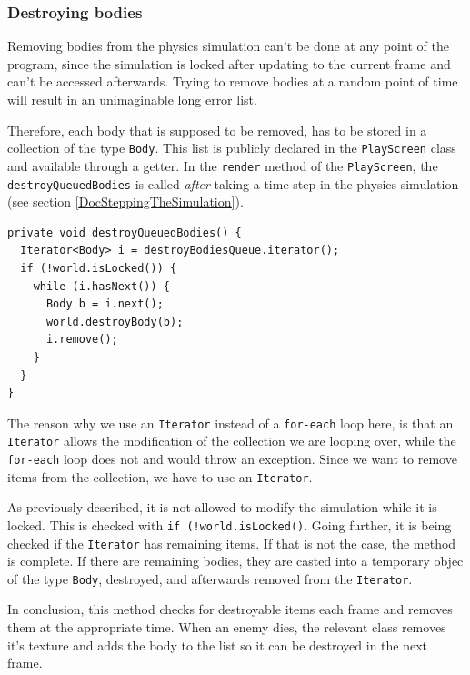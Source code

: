 \documentclass[12p]{article}
\begin{document}

\subsubsection{Destroying bodies} \label{DocDestroyingBodies}

Removing bodies from the physics simulation can't be done at any point of the program, since the simulation is locked after updating to the current frame and can't be accessed afterwards. Trying to remove bodies at a random point of time will result in an unimaginable long error list.

Therefore, each body that is supposed to be removed, has to be stored in a collection of the type \texttt{Body}. This list is publicly declared in the \texttt{PlayScreen} class and available through a getter. In the \texttt{render} method of the \texttt{PlayScreen}, the \texttt{destroyQueuedBodies} is called \emph{after} taking a time step in the physics simulation (see section \ref{DocSteppingTheSimulation}).

\begin{verbatim}
private void destroyQueuedBodies() {
  Iterator<Body> i = destroyBodiesQueue.iterator();
  if (!world.isLocked()) {
    while (i.hasNext()) {
      Body b = i.next();
      world.destroyBody(b);
      i.remove();
    }
  }
}
\end{verbatim}

The reason why we use an \texttt{Iterator} instead of a \texttt{for-each} loop here, is that an \texttt{Iterator} allows the modification of the collection we are looping over, while the \texttt{for-each} loop does not and would throw an exception. Since we want to remove items from the collection, we have to use an \texttt{Iterator}.

As previously described, it is not allowed to modify the simulation while it is locked. This is checked with \texttt{if (!world.isLocked()}. Going further, it is being checked if the \texttt{Iterator} has remaining items. If that is not the case, the method is complete. If there are remaining bodies, they are casted into a temporary objec of the type \texttt{Body}, destroyed, and afterwards removed from the \texttt{Iterator}.

In conclusion, this method checks for destroyable items each frame and removes them at the appropriate time. When an enemy dies, the relevant class removes it's texture and adds the body to the list so it can be destroyed in the next frame.
\end{document}
